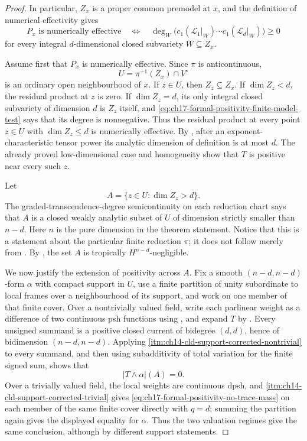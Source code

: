 \begin{proof}
In particular, $Z_x$ is a proper common premodel at $x$, and the
definition of numerical effectivity gives
\begin{equation}
 P_x\text{ is numerically effective}
 \quad\Longleftrightarrow\quad
 \deg_W\bigl(c_1(\mathscr L_1|_W)\cdots
                  c_1(\mathscr L_d|_W)\bigr)\geq0
 \label{eq:ch17-formal-positivity-finite-model-test}
\end{equation}
for every integral $d$-dimensional closed subvariety
$W\subseteq Z_x$.

Assume first that $P_x$ is numerically effective.  Since $\pi$ is
anticontinuous,
\[
                         U=\pi^{-1}(Z_x)\cap V^\circ
\]
is an ordinary open neighbourhood of $x$.  If $z\in U$, then
$Z_z\subseteq Z_x$.  If $\dim Z_z<d$, the residual product at $z$
is zero.  If $\dim Z_z=d$, its only integral closed subvariety of
dimension $d$ is $Z_z$ itself, and
\eqref{eq:ch17-formal-positivity-finite-model-test} says that its degree is
nonnegative.  Thus the residual product at every point $z\in U$ with
$\dim Z_z\leq d$ is numerically effective.  By
\cite[Proposition~17.6.4]{CLD25}, after an exponent-characteristic tensor
power its analytic dimension of definition is at most $d$.  The already
proved low-dimensional case and homogeneity show that $T$ is positive
near every such $z$.

Let
\[
                         A=\{z\in U:\dim Z_z>d\}.
\]
The graded-transcendence-degree semicontinuity on each reduction chart
\cite[Proposition~11.10.4]{CLD25} says that $A$ is a closed weakly
analytic subset of $U$ of dimension strictly smaller than $n-d$.
Here $n$ is the pure dimension in the theorem statement.  Notice that
this is a statement about the particular finite
reduction $\pi$; it does not follow merely from
.  By
\cite[Example~16.8.4]{CLD25}, the set $A$ is tropically
$H^{n-d}$-negligible.

We now justify the extension of positivity across $A$.  Fix a smooth
$(n-d,n-d)$-form $\alpha$ with compact support in $U$, use a finite
partition of unity subordinate to local frames over a neighbourhood of its
support, and work on one member of that finite cover.  Over a nontrivially
valued field, write each parlinear weight as a difference of two continuous
psh functions using , and expand $T$ by
.  Every unsigned summand is a positive closed
current of bidegree $(d,d)$, hence of bidimension $(n-d,n-d)$.
Applying \cref{itm:ch14-cld-support-corrected-nontrivial} to every summand,
and then using subadditivity of total variation for the finite signed sum,
shows that
\begin{equation}
                              |T\wedge\alpha|(A)=0.
 \label{eq:ch17-formal-positivity-no-trace-mass}
\end{equation}
Over a trivially valued field, the local weights are continuous dpsh, and
\cref{itm:ch14-cld-support-corrected-trivial} gives
\eqref{eq:ch17-formal-positivity-no-trace-mass} on each member of the same
finite cover directly with $q=d$; summing the partition again gives the
displayed equality for $\alpha$.
Thus the two valuation regimes give the same conclusion, although by
different support statements.


\end{proof}
